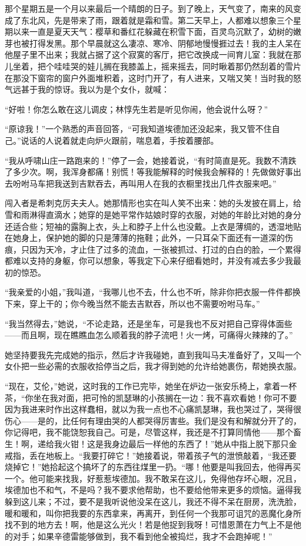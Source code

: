 \par 那个星期五是一个月以来最后一个晴朗的日子。到了晚上，天气变了，南来的风变成了东北风，先是带来了雨，跟着就是霜和雪。第二天早上，人都难以想象三个星期以来一直是夏天天气：樱草和番红花躲藏在积雪下面，百灵鸟沉默了，幼树的嫩芽也被打得发黑。那个早晨就这么凄凉、寒冷、阴郁地慢慢捱过去！我的主人呆在他屋子里不出来；我就占据了这个寂寞的客厅，把它改换成一间育儿室：我就在那儿坐着，把个哇哇哭的娃儿搁在我膝盖上，摇来摇去，同时瞅着那仍然刮着的雪片在那没下窗帘的窗户外面堆积着，这时门开了，有人进来，又喘又笑！当时我的怒气远甚于我的惊讶。我以为是个女仆，就喊：
\par “好啦！你怎么敢在这儿调皮；林惇先生若是听见你闹，他会说什么呀？”
\par “原谅我！”一个熟悉的声音回答，“可我知道埃德加还没起来，我又管不住自己。”说话的人说着就走向炉火跟前，喘息着，手按着腰部。
\par “我从呼啸山庄一路跑来的！”停了一会，她接着说，“有时简直是死。我数不清跌了多少次。啊，我浑身都痛！别慌！等我能解释的时候我会解释的！先做做好事出去吩咐马车把我送到吉默吞去，再叫用人在我的衣橱里找出几件衣服来吧。”
\par 闯入者是希刺克厉夫夫人。她那情形也实在叫人笑不出来：她的头发披在肩上，给雪和雨淋得直滴水；她穿的是她平常作姑娘时穿的衣服，对她的年龄比对她的身分还适合些；短袖的露胸上衣，头上和脖子上什么也没戴。上衣是薄绸的，透湿地贴在她身上，保护她的脚的只是薄薄的拖鞋；此外，一只耳朵下面还有一道深的伤痕，只因为天冷，才止住了过多的流血，一张被抓过、打过的白白的脸，一个累得都难以支持的身躯，你可以想象，等我定下心来仔细看她时，并没有减去多少我最初的惊恐。
\par “我亲爱的小姐，”我叫道，“我哪儿也不去，什么也不听，除非你把衣服一件件都换下来，穿上干的；你今晚当然不能去吉默吞，所以也不需要吩咐马车。”
\par “我当然得去，”她说，“不论走路，还是坐车，可是我也不反对把自己穿得体面些——而且啊，现在瞧瞧血怎么顺着我的脖子流吧！火一烤，可痛得火辣辣的了。”
\par 她坚持要我先完成她的指示，然后才许我碰她，直到我叫马夫准备好了，又叫一个女仆把一些必需的衣服收拾停当之后，我才得到她的允许给她裹伤，帮她换衣服。
\par “现在，艾伦，”她说，这时我的工作已完毕，她坐在炉边一张安乐椅上，拿着一杯茶，“你坐在我对面，把可怜的凯瑟琳的小孩搁在一边：我不喜欢看她！你可不要因为我进来时作出这样蠢相，就以为我一点也不心痛凯瑟琳，我也哭过了，哭得很伤心——是的，比任何有理由哭的人都哭得厉害些。我们是没有和解就分开了的，你记得吧，我不能饶恕我自己。可是，尽管这样，我还是不打算同情他——那个畜生！啊，递给我火钳！这是我身边最后一样他的东西了！”她从中指上脱下那只金戒指，丢在地板上。“我要打碎它！”她接着说，带着孩子气的泄愤敲着，“我还要烧掉它！”她拾起这个搞坏了的东西往煤里一扔。“哪！他要是叫我回去，他得再买一个。他可能来找我，好惹惹埃德加。我不敢呆在这儿，免得他存坏心眼，况且，埃德加也不和气，不是吗？我不要求他帮助，也不要给他带来更多的烦恼。逼得我躲到这儿来；不过，要不是我听说他没呆在这儿，我还不得不呆在厨房，洗洗脸，暖和暖和，叫你把我要的东西拿来，再离开，到任何一个我那可诅咒的恶魔化身所找不到的地方去！啊，他是这么光火！若是他捉到我呀！可惜恩萧在力气上不是他的对手；如果辛德雷能够做到，我不看到他全被捣烂，我才不会跑掉呢！”
